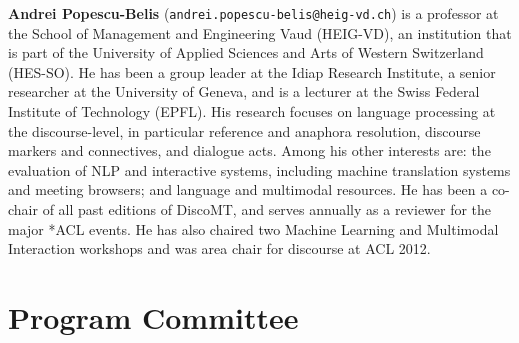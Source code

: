 \documentclass[11pt]{article}
\begin{document}
\textbf{Andrei Popescu-Belis} (\texttt{andrei.popescu-belis@heig-vd.ch}) is a professor at the School of Management and Engineering Vaud (HEIG-VD), an institution that is part of the University of Applied Sciences and Arts of Western Switzerland (HES-SO).  He has been a group leader at the Idiap Research Institute, a senior researcher at the University of Geneva, and is a lecturer at the Swiss Federal Institute of Technology (EPFL).  His research focuses on language processing at the discourse-level, in particular reference and anaphora resolution, discourse markers and connectives, and dialogue acts.  Among his other interests are: the evaluation of NLP and interactive systems, including machine translation systems and meeting browsers; and language and multimodal resources.  He has been a co-chair of all past editions of DiscoMT, and serves annually as a reviewer for the major *ACL events.  He has also chaired two Machine Learning and Multimodal Interaction workshops and was area chair for discourse at ACL 2012.


\section{Program Committee}

\end{document}
